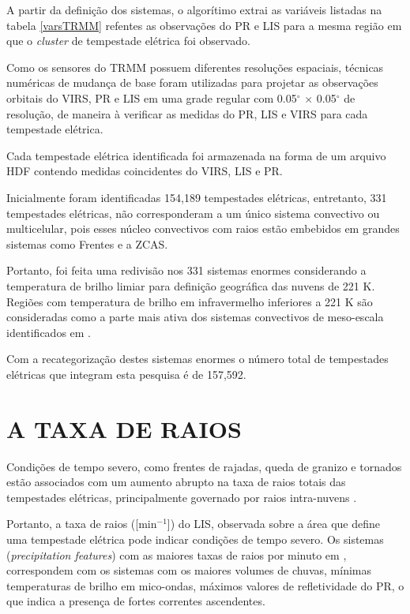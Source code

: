 
A partir da definição dos sistemas, o algorítimo extrai as variáveis listadas na tabela \ref{varsTRMM} refentes as observações do PR e LIS para a mesma região em que o \textit{cluster} de tempestade elétrica foi observado.

Como os sensores do TRMM possuem diferentes resoluções espaciais, técnicas numéricas de mudança de base foram utilizadas para projetar as observações orbitais do VIRS, PR e LIS em uma grade regular com 0.05$^{\circ}$ $\times$ 0.05$^{\circ}$ de resolução, de maneira à verificar as medidas do PR, LIS e VIRS para cada tempestade elétrica.

Cada tempestade elétrica identificada foi armazenada na forma de um arquivo HDF contendo medidas coincidentes do VIRS, LIS e PR. 

Inicialmente foram identificadas 154,189 tempestades elétricas, entretanto, 331 tempestades elétricas, não corresponderam a um único sistema convectivo ou multicelular, pois esses núcleo convectivos com raios estão embebidos em grandes sistemas como Frentes e a ZCAS. 

Portanto, foi feita uma redivisão nos 331 sistemas enormes considerando a temperatura de brilho limiar para definição geográfica das nuvens de 221 K. Regiões com temperatura de brilho em infravermelho inferiores a 221 K são consideradas como a parte mais ativa dos sistemas convectivos de meso-escala identificados em . 

Com a recategorização destes sistemas enormes o número total de tempestades elétricas que integram esta pesquisa é de 157,592.


\section{A TAXA DE RAIOS}
\label{metodoFtaFt}


Condições de tempo severo, como frentes de rajadas, queda de granizo e tornados estão associados com um aumento abrupto na taxa de raios totais das tempestades elétricas, principalmente governado por raios intra-nuvens \cite{macgorman1989,carey1998,williams1999}.   

Portanto, a taxa de raios ([min$^{-1}$]) do LIS, observada sobre a área que define uma tempestade elétrica pode indicar condições de tempo severo. Os sistemas (\textit{precipitation features}) com as maiores 
taxas de raios por minuto em , correspondem com os sistemas com os maiores volumes de chuvas, mínimas temperaturas de brilho em mico-ondas, máximos valores de refletividade do PR, o que indica a presença de fortes correntes ascendentes. 


